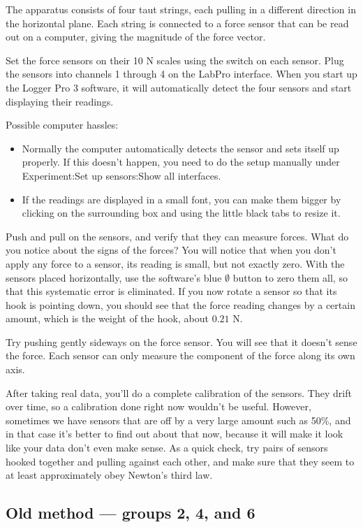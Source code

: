 The apparatus consists of 
four taut strings, each pulling in a different direction
in the horizontal plane. Each string is connected to a force sensor
that can be read out on a computer, giving the magnitude of the
force vector.


Set the force sensors on their 10 N scales using the switch on each
sensor.
Plug the sensors into channels 1 through 4 on the LabPro interface.
When you start up the Logger Pro 3 software, it will automatically detect
the four sensors and start displaying their readings. 


Possible computer hassles:
\begin{itemize}
\item[] Normally the computer automatically detects the sensor and sets itself up
properly. If this doesn't happen, you need to do the setup manually under
Experiment:Set up sensors:Show all interfaces.
\item[] If the readings are displayed in a small font, you can make them bigger
by clicking on the surrounding box and using the little black tabs to resize it.
\end{itemize}

Push and pull on the sensors, and verify that they can measure forces.
What do you notice about the signs of the forces?
You will notice that when you don't apply any force to a sensor, its reading
is small, but not exactly zero.
With the sensors placed horizontally, use the software's blue $\emptyset$ button to zero them all, so that
this systematic error is eliminated. If you now rotate a sensor so that its hook
is pointing down, you should see that the force reading changes by a certain amount,
which is the weight of the hook, about $0.21$ N.

Try pushing gently sideways on the force sensor. You will see that it doesn't
sense the force.
Each sensor can only measure the component of the force along its
own axis.

After taking real data, you'll do a complete calibration of the
sensors. They drift over time, so a calibration done right now wouldn't be useful.
However, sometimes we have sensors that are off by a very large
amount such as 50\%, and in that case it's better to find out about that now, because
it will make it look like your data don't even make sense. As a quick check, try
pairs of sensors hooked together and pulling against each other, and make sure that
they seem to at least approximately obey Newton's third law.

\subsection*{Old method --- groups 2, 4, and 6}

